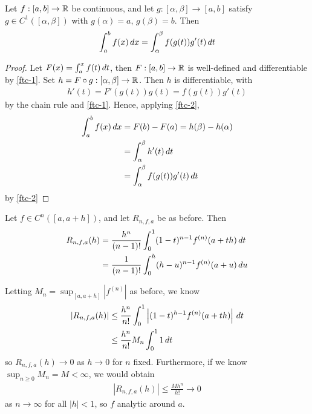 \documentclass{../../template/note}
\begin{document}
    \begin{proposition}
        Let \(f: [a, b] \to \mathbb R\) be continuous, and let \(g: [\alpha, \beta] \to [a, b]\) satisfy \(g \in C^1([\alpha, \beta])\) with \(g(\alpha) = a\), \(g(\beta) = b\). Then
        \begin{align*}
            \int_a^b f(x) \,d{x} = \int_\alpha^\beta f(g(t)) g'(t) \,d{t}
        \end{align*}
    \end{proposition}
    
    \begin{proof}
        Let \(F(x) = \int_a^x f(t) \,d{t}\), then \(F: [a, b] \to \mathbb R\) is well-defined and differentiable by \cref{ftc-1}. Set \(h = F \circ g: [\alpha, \beta] \to \mathbb R\). Then \(h\) is differentiable, with
        \begin{align*}
            h'(t) = F'(g(t))g(t) = f(g(t))g'(t)
        \end{align*}
        by the chain rule and \cref{ftc-1}. Hence, applying \cref{ftc-2},
        \begin{align*}
            \int_a^b f(x) \,d{x} &= F(b) - F(a) = h(\beta) - h(\alpha) \\
            &= \int_\alpha^\beta h'(t) \,d{t} \\
            &= \int_\alpha^\beta f(g(t)) g'(t) \,d{t}
        \end{align*}
        by \cref{ftc-2}
    \end{proof}
    
    \begin{theorem}
        Let \(f \in C^n([a, a+h])\), and let \(R_{n,f,a}\) be as before. Then
        \begin{align*}
            R_{n,f,a}(h) &= \frac{h^n}{(n-1)!} \int_0^1 (1-t)^{n-1}f^{(n)}(a+th) \,d{t} \\
            &= \frac 1 {(n-1)!} \int_0^h (h-u)^{n-1} f^{(n)}(a+u) \,d{u}
        \end{align*}
    \end{theorem}
    
    \begin{remark*}
        Letting \(M_n = \sup_{[a,a+h]}|f^{(n)}|\) as before, we know
        \begin{align*}
            \left|R_{n,f,a}(h)\right| &\leq \frac{h^n}{n!} \int_0^1 \left|(1-t)^{h-1} f^{(n)}(a+th)\right| \,d{t} \\
            &\leq \frac{h^n}{n!} M_n \int_0^1 1 \,d{t}
        \end{align*}
        so \(R_{n,f,a}(h) \to 0\) as \(h \to 0\) for \(n\) fixed. Furthermore, if we know \(\sup_{n \geq 0} M_n = M < \infty\), we would obtain
        \begin{align*}
            |R_{n,f,a}(h)| \leq \frac{Mh^n}{h!} \to 0
        \end{align*}
        as \(n \to \infty\) for all \(|h| < 1\), so \(f\) analytic around \(a\).       
    \end{remark*}
    
\end{document}
